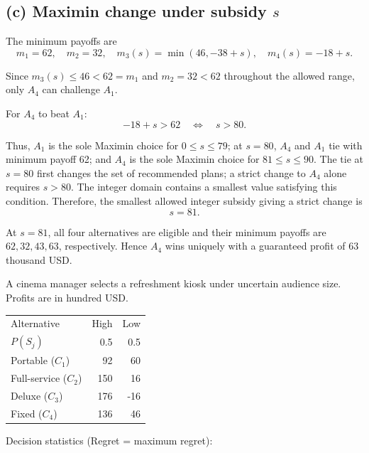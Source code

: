 \secInicio[sec:q1]

\label{sol:q1c}
\subsection*{(c) Maximin change under subsidy $s$ }

The minimum payoffs are
\[
m_1=62,\quad m_2=32,\quad
m_3(s)=\min(46,-38+s),\quad m_4(s)=-18+s.
\]

Since $m_3(s)\le46<62=m_1$ and $m_2=32<62$ throughout
the allowed range, only $A_4$ can challenge $A_1$.

For $A_4$ to beat $A_1$:
\[
-18+s>62
\quad\Longleftrightarrow\quad s>80.
\]

Thus, $A_1$ is the sole Maximin choice for $0\le s\le79$;
at $s=80$, $A_4$ and $A_1$ tie with minimum payoff 62;
and $A_4$ is the sole Maximin choice for $81\le s\le90$.
The tie at $s=80$ first changes the set of recommended plans;
a strict change to $A_4$ alone requires $s>80$.
The integer domain contains a smallest value satisfying this condition.
Therefore, the smallest allowed integer subsidy giving a strict change is
\[
\boxed{s=81}.
\]

At $s=81$, all four alternatives are eligible and their minimum
payoffs are $62,32,43,63$, respectively. Hence $A_4$ wins uniquely
with a guaranteed profit of 63 thousand USD.
\secInicio[sec:q1]



A cinema manager selects a refreshment kiosk under uncertain audience size. Profits are in hundred USD.

\begin{center}\small\setlength{\tabcolsep}{4pt}
	\begin{tabular}{lrr}\toprule
		Alternative & High & Low\\
		$P(S_j)$ & 0.5 & 0.5\\ \midrule
				Portable ($C_1$) & 92 & 60\\
		Full-service ($C_2$) & 150 & 16\\
		Deluxe ($C_3$) & 176 & -16\\
		Fixed ($C_4$) & 136 & 46\\
		\bottomrule
	\end{tabular}
\end{center} \vspace{-3mm}

Decision statistics (Regret = maximum regret):

